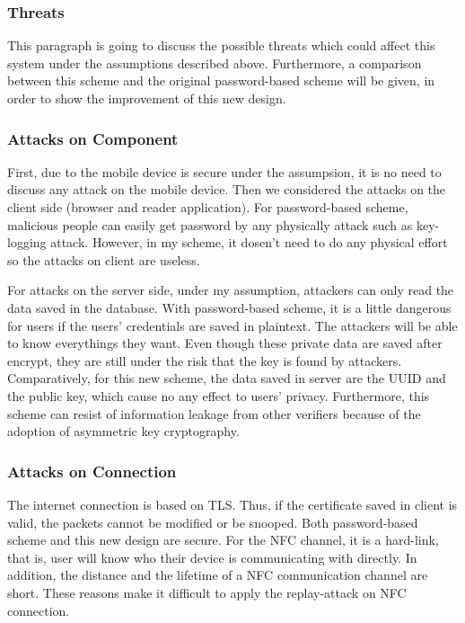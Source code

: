 \begin{CJK}{Bg5}{bsmi}
\subsubsection{Threats}

This paragraph is going to discuss the possible threats which could affect this system under the assumptions described above. Furthermore, a comparison between this scheme and the original password-based scheme will be given, in order to show the improvement of this new design.

\subsubsection{Attacks on Component}

First, due to the mobile device is secure under the assumpsion, it is no need to discuss any attack on the mobile device. Then we considered the attacks on the client side (browser and reader application). For password-based scheme, malicious people can easily get password by any physically attack such as key-logging attack. However, in my scheme, it dosen't need to do any physical effort so the attacks on client are useless.

For attacks on the server side, under my assumption, attackers can only read the data saved in the database. With password-based scheme, it is a little dangerous for users if the users' credentials are saved in plaintext. The attackers will be able to know everythings they want. Even though these private data are saved after encrypt, they are still under the risk that the key is found by attackers. Comparatively, for this new scheme, the data saved in server are the UUID and the public key, which cause no any effect to users' privacy. Furthermore, this scheme can resist of information leakage from other verifiers because of the adoption of asymmetric key cryptography.

\subsubsection{Attacks on Connection}

The internet connection is based on TLS. Thus, if the certificate saved in client is valid, the packets cannot be modified or be snooped. Both password-based scheme and this new design are secure. For the NFC channel, it is a hard-link, that is, user will know who their device is communicating with directly. In addition, the distance and the lifetime of a NFC communication channel are short. These reasons make it difficult to apply the replay-attack on NFC connection. 


\end{CJK}
